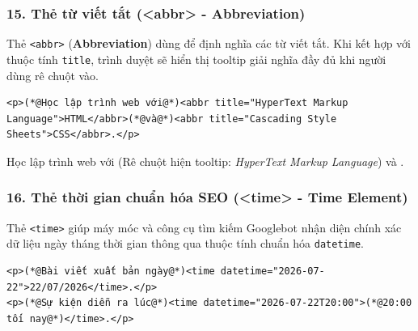 \documentclass[11pt,oneside]{book}
\newcommand{\codeinline}[1]{\textcolor{accentOrange}{\texttt{#1}}}
\begin{document}
\subsubsection{15. Thẻ từ viết tắt (<abbr> - Abbreviation)}

Thẻ \codeinline{<abbr>} (\textbf{Abbreviation}) dùng để định nghĩa các từ viết tắt. Khi kết hợp với thuộc tính \codeinline{title}, trình duyệt sẽ hiển thị tooltip giải nghĩa đầy đủ khi người dùng rê chuột vào.

\begin{codeWindow}
\begin{lstlisting}[language=HTML5]
<p>(*@Học lập trình web với@*)<abbr title="HyperText Markup Language">HTML</abbr>(*@và@*)<abbr title="Cascading Style Sheets">CSS</abbr>.</p>
\end{lstlisting}
\end{codeWindow}

\begin{tcolorbox}[
    enhanced, colback=white, colframe=primaryBlue!20, arc=6pt, boxrule=0.8pt, drop shadow=black!3!white,
    top=8pt, bottom=8pt, left=12pt, right=12pt,
    title={\sffamily\bfseries\scriptsize\color{codeComment} KẾT QUẢ HIỂN THỊ TRÊN TRÌNH DUYỆT (BROWSER PREVIEW)},
    coltitle=codeComment, colbacktitle=codeBg!80!white
]
Học lập trình web với  (Rê chuột hiện tooltip: \textit{HyperText Markup Language}) và .
\end{tcolorbox}

\subsubsection{16. Thẻ thời gian chuẩn hóa SEO (<time> - Time Element)}

Thẻ \codeinline{<time>} giúp máy móc và công cụ tìm kiếm Googlebot nhận diện chính xác dữ liệu ngày tháng thời gian thông qua thuộc tính chuẩn hóa \codeinline{datetime}.

\begin{codeWindow}
\begin{lstlisting}[language=HTML5]
<p>(*@Bài viết xuất bản ngày@*)<time datetime="2026-07-22">22/07/2026</time>.</p>
<p>(*@Sự kiện diễn ra lúc@*)<time datetime="2026-07-22T20:00">(*@20:00 tối nay@*)</time>.</p>
\end{lstlisting}
\end{codeWindow}
\end{document}
